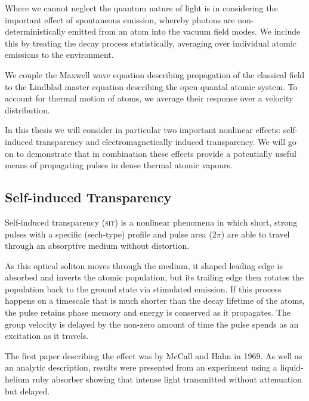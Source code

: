    Where we cannot neglect the quantum nature of light is in considering the
    important effect of spontaneous emission, whereby photons are non-
    deterministically emitted from an atom into the vacuum field modes. We
    include this by treating the decay process statistically, averaging over
    individual atomic emissions to the environment.\cite{loudon2000quantum}

    We couple the Maxwell wave equation describing propagation of the classical
    field to the Lindblad master equation describing the open quantal atomic
    system. To account for thermal motion of atoms, we average their response
    over a velocity distribution.\cite{foot2005atomic}

    In this thesis we will consider in particular two important nonlinear
    effects: self-induced transparency and electromagnetically induced
    transparency. We will go on to demonstrate that in combination these effects
    provide a potentially useful means of propagating pulses in dense thermal
    atomic vapours.


  \subsection*{Self-induced Transparency}

    Self-induced transparency (\textsc{sit}) is a nonlinear phenomena in which
    short, strong pulses with a specific (sech-type) profile and pulse area
    ($2\pi$) are able to travel through an absorptive medium without
    distortion.

    As this optical soliton moves through the medium, it shaped leading edge
    is absorbed and inverts the atomic population, but its trailing edge then
    rotates the population back to the ground state via stimulated
    emission.\cite{allen1975optical} If this process happens on a timescale that
    is much shorter than the decay lifetime of the atoms, the pulse retains
    phase memory and energy is conserved as it propagates. The group velocity is
    delayed by the non-zero amount of time the pulse spends as an excitation as
    it travels.

    The first paper describing the effect was by McCall and Hahn in
    1969.\cite{McCall1969} As well as an analytic description, results were
    presented from an experiment using a liquid-helium ruby absorber showing
    that intense light transmitted without attenuation but delayed.

